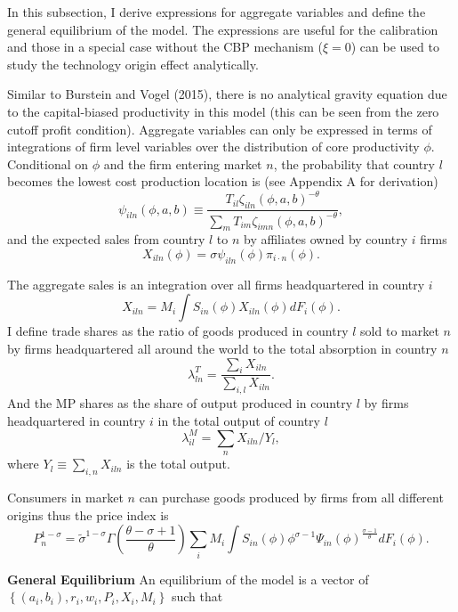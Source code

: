\documentclass[notitlepage,11pt]{article}%
\begin{document}
In this subsection, I derive expressions for aggregate variables and define
the general equilibrium of the model. The expressions are useful for the
calibration and those in a special case without the CBP mechanism ($\xi=0$)
can be used to study the technology origin effect analytically.

Similar to Burstein and Vogel (2015), there is no analytical gravity equation
due to the capital-biased productivity in this model (this can be seen from
the zero cutoff profit condition). Aggregate variables can only be expressed
in terms of integrations of firm level variables over the distribution of core
productivity $\phi$. Conditional on $\phi$ and the firm entering market $n$,
the probability that country $l$ becomes the lowest cost production location
is (see Appendix A for derivation)%
\[
\psi_{iln}\left(  \phi,a,b\right)  \equiv\frac{T_{il}\zeta_{iln}\left(
\phi,a,b\right)  ^{-\theta}}{\sum_{m}T_{im}\zeta_{imn}\left(  \phi,a,b\right)
^{-\theta}},
\]
and the expected sales from country $l$ to $n$ by affiliates owned by country
$i$ firms%
\[
X_{iln}\left(  \phi\right)  =\sigma\psi_{iln}\left(  \phi\right)  \pi_{i\cdot
n}\left(  \phi\right)  .
\]


The aggregate sales is an integration over all firms headquartered in country
$i$%
\[
X_{iln}=M_{i}\int S_{in}\left(  \phi\right)  X_{iln}\left(  \phi\right)
dF_{i}\left(  \phi\right)  .
\]
I define trade shares as the ratio of goods produced in country $l$ sold to
market $n$ by firms headquartered all around the world to the total absorption
in country $n$%
\[
\lambda_{ln}^{T}=\frac{\sum_{i}X_{iln}}{\sum_{i,l}X_{iln}}.
\]
And the MP shares as the share of output produced in country $l$ by firms
headquartered in country $i$ in the total output of country $l$%
\[
\lambda_{il}^{M}=\sum_{n}X_{iln}/Y_{l},
\]
where $Y_{l}\equiv\sum_{i,n}X_{iln}$ is the total output.

Consumers in market $n$ can purchase goods produced by firms from all
different origins thus the price index is%
\begin{equation}
P_{n}^{1-\sigma}=\tilde{\sigma}^{1-\sigma}\Gamma\left(  \frac{\theta-\sigma
+1}{\theta}\right)  \sum_{i}M_{i}\int S_{in}\left(  \phi\right)  \phi
^{\sigma-1}\Psi_{in}\left(  \phi\right)  ^{\frac{\sigma-1}{\theta}}%
dF_{i}\left(  \phi\right)  . \label{price_index}%
\end{equation}


\textbf{General} \textbf{Equilibrium} An equilibrium of the model is a vector
of $\left\{  \left(  a_{i},b_{i}\right)  ,r_{i},w_{i},P_{i},X_{i}%
,M_{i}\right\}  $ such that
\end{document}
